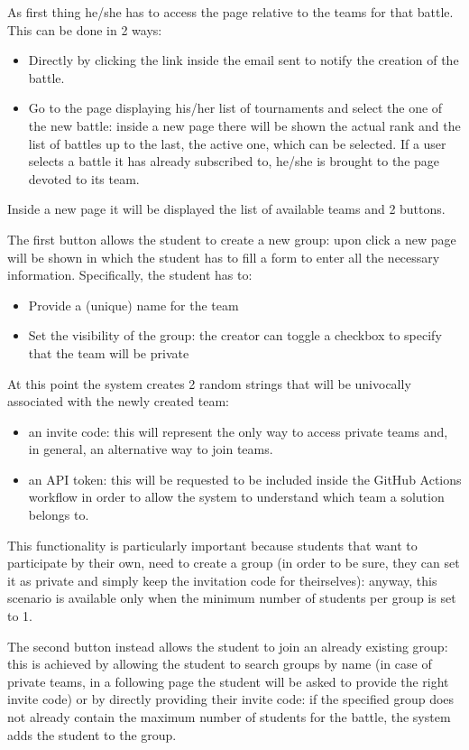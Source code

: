 As first thing he/she has to access the page relative to the teams for that battle. This can be done in 2 ways:
\begin{itemize}
    \item Directly by clicking the link inside the email sent to notify the creation of the battle.
    \item Go to the page displaying his/her list of tournaments and select the one of the new battle: inside a new page there will be shown the actual rank and the list of battles up to the last,  the active one, which can be selected. If a user selects a battle it has already subscribed to, he/she is brought to the page devoted to its team.
\end{itemize}
Inside a new page it will be displayed the list of available teams and 2 buttons.

The first button allows the student to create a new group: upon click a new page will be shown in which the student has to fill a form to enter all the necessary information. Specifically, the student has to:
\begin{itemize}
    \item Provide a (unique) name for the team
    \item Set the visibility of the group: the creator can toggle a checkbox to specify that the team will be private
\end{itemize}
At this point the system creates 2 random strings that will be univocally associated with the newly created team:
\begin{itemize}
    \item an invite code: this will represent the only way to access private teams and, in general, an alternative way to join teams.
    \item an API token: this will be requested to be included inside the GitHub Actions workflow in order to allow the system to understand which team a solution belongs to.
\end{itemize}  
This functionality is particularly important because students that want to participate by their own, need to create a group (in order to be sure, they can set it as private and simply keep the invitation code for theirselves): anyway, this scenario is available only when the minimum number of students per group is set to 1.

The second button instead allows the student to join an already existing group: this is achieved by allowing the student to search groups by name (in case of private teams, in a following page the student will be asked to provide the right invite code) or by directly providing their invite code: if the specified group does not already contain the maximum number of students for the battle, the system adds the student to the group.

